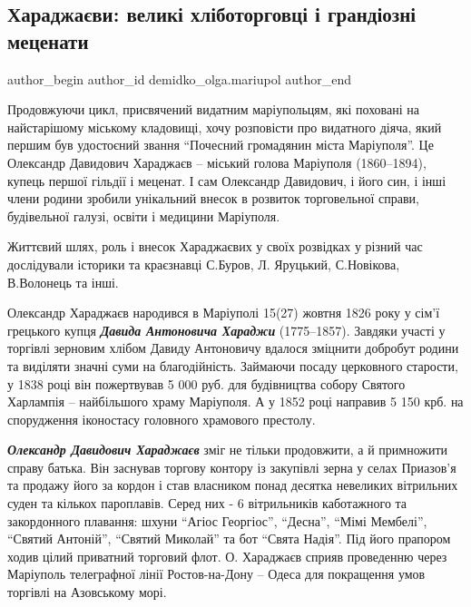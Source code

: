  
 
 
 
 
 
\subsection{Хараджаєви: великі хліботорговці і грандіозні меценати}
\label{sec:22_11_2021.stz.news.ua.mrpl_city.1.haradzhajevy_mecenaty}
 
\ifcmt
 author_begin
   author_id demidko_olga.mariupol
 author_end
\fi

Продовжуючи цикл, присвячений видатним маріупольцям, які поховані на
найстарішому міському кладовищі, хочу розповісти про видатного діяча, який
першим був удостоєний звання \enquote{Почесний громадянин міста Маріуполя}. Це
Олександр Давидович Хараджаєв – міський голова Маріуполя (1860–1894), купець
першої гільдії і меценат. І сам Олександр Давидович, і його син, і інші члени
родини зробили унікальний внесок в розвиток торговельної справи, будівельної
галузі, освіти і медицини Маріуполя.


Життєвий шлях, роль і внесок Хараджаєвих у своїх розвідках у різний час
дослідували історики та краєзнавці С.Буров, Л. Яруцький, С.Новікова, В.Волонець
та інші.

Олександр Хараджаєв народився в Маріуполі 15(27) жовтня 1826 року у сім'ї
грецького купця \textbf{\emph{Давида Антоновича Хараджи}} (1775–1857). Завдяки участі у
торгівлі зерновим хлібом Давиду Антоновичу вдалося зміцнити добробут родини та
виділяти значні суми на благодійність. Займаючи посаду церковного старости, у
1838 році він пожертвував 5 000 руб. для будівництва собору Святого Харлампія –
найбільшого храму Маріуполя. А у 1852 році направив 5 150 крб. на спорудження
іконостасу головного храмового престолу.

\emph{\textbf{Олександр Давидович Хараджаєв}} зміг не тільки продовжити, а й примножити справу
батька.  Він заснував торгову контору із закупівлі зерна у селах Приазов'я та
продажу його за кордон і став власником понад десятка невеликих вітрильних
суден та кількох пароплавів. Серед них - 6 вітрильників каботажного та
закордонного плавання: шхуни \enquote{Агіос Георгіос}, \enquote{Десна}, \enquote{Мімі Мембелі}, \enquote{Святий
Антоній}, \enquote{Святий Миколай} та бот \enquote{Свята Надія}. Під його прапором ходив цілий
приватний торговий флот. О. Хараджаєв сприяв проведенню через Маріуполь
телеграфної лінії Ростов-на-Дону – Одеса для покращення умов торгівлі на
Азовському морі.

